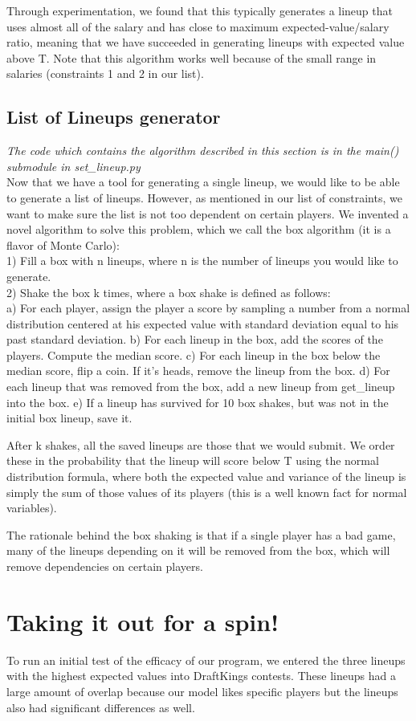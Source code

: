 \documentclass[12pt]{article}
\renewcommand{\=}[1]{\stackrel{#1}{=}} %
\theoremstyle{definition}
\begin{document}
Through experimentation, we found that this typically generates a lineup that uses almost all of the salary and has close to maximum expected-value/salary ratio, meaning that we have succeeded in generating lineups with expected value above T. Note that this algorithm works well because of the small range in salaries (constraints 1 and 2 in our list).  

\subsection{List of Lineups generator}
\label{lge}
\emph{The code which contains the algorithm described in this section is in the main() submodule in set\_lineup.py} \\

Now that we have a tool for generating a single lineup, we would like to be able to generate a list of lineups. However, as mentioned in our list of constraints, we want to make sure the list is not too dependent on certain players.  We invented a novel algorithm to solve this problem, which we call the box algorithm (it is a flavor of Monte Carlo):\\

1) Fill a box with n lineups, where n is the number of lineups you would like to generate.  \\
2) Shake the box k times, where a box shake is defined as follows: \\
a) For each player, assign the player a score by sampling a number from a normal distribution centered at his expected value with standard deviation equal to his past standard deviation.  
b) For each lineup in the box, add the scores of the players. Compute the median score.
c) For each lineup in the box below the median score, flip a coin.  If it's heads, remove the lineup from the box.  
d) For each lineup that was removed from the box, add a new lineup from get\_lineup into the box.
e) If a lineup has survived for 10 box shakes, but was not in the initial box lineup, save it.

After k shakes, all the saved lineups are those that we would submit.  We order these in the probability that the lineup will score below T using the normal distribution formula, where both the expected value and variance of the lineup is simply the sum of those values of its players (this is a well known fact for normal variables).  

The rationale behind the box shaking is that if a single player has a bad game, many of the lineups depending on it will be removed from the box, which will remove dependencies on certain players.  

\section{Taking it out for a spin!}
\label{ga}
To run an initial test of the efficacy of our program, we entered the three lineups with the highest expected values into DraftKings contests. These lineups had a large amount of overlap because our model likes specific players but the lineups also had significant differences as well. 
 
\end{document}
